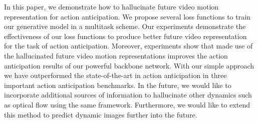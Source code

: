 In this paper, we demonstrate how to hallucinate future video motion representation for action anticipation. We propose several loss functions to train our generative model in a multitask scheme. Our experiments demonstrate the effectiveness of our loss functions to produce better future video representation for the task of action anticipation. Moreover, experiments show that made use of the hallucinated future video motion representations improves the action anticipation results of our powerful backbone network. With our simple approach we have outperformed the state-of-the-art in action anticipation in three important action anticipation benchmarks. In the future, we would like to incorporate additional sources of information to hallucinate other dynamics such as optical flow using the same framework. Furthermore, we would like to extend this method to predict dynamic images further into the future. 
